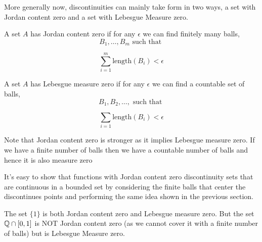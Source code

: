 More generally now, discontinuities can mainly take form in two ways, a set with Jordan content zero and a set with Lebesgue Measure zero.

\begin{definition}
    A set $A$ has Jordan content zero if for any $\epsilon$ we can find finitely many balls, 
    \[
        B_{1}, \dots, B_m \text{ such that }
    \]
    
    \[
        \sum_{i = 1}^{m} \text{length}(B_i) < \epsilon
    \]
\end{definition}

\begin{definition}
    A set $A$ has Lebesgue measure zero if for any $\epsilon$ we can find a countable set of balls,
    \[
        B_{1}, B_{2}, \dots, \text{ such that }
    \]
    
    \[
        \sum_{i = 1} \text{length}(B_i) < \epsilon
    \]
\end{definition}

\begin{note}
    Note that Jordan content zero is stronger as it implies Lebesgue measure zero. If we have a finite number of balls then we have a countable number of balls and hence it is also measure zero
\end{note}
\begin{note}
    It's easy to show that functions with Jordan content zero discontinuity sets that are continuous in a bounded set by considering the finite balls that center the discontinues points and performing the same idea shown in the previous section.
\end{note}
\begin{eg}
    The set $\{1\}$ is both Jordan content zero and Lebesgue measure zero. But the set $\mathbb{Q} \cap [0, 1]$ is NOT Jordan content zero (as we cannot cover it with a finite number of balls) but is Lebesgue Measure zero.
\end{eg}

